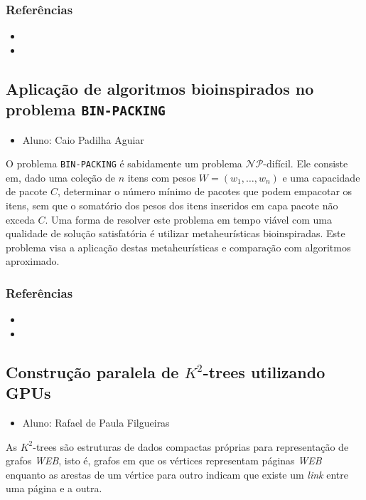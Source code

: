 \documentclass{article}
\newcommand*{\nsubsection}[1]{
    \subsection{#1}
}
\begin{document}
\subsubsection*{Referências}

\begin{itemize}
	\item {}
	\item {}
\end{itemize}

\nsubsection{Aplicação de algoritmos bioinspirados no problema {\tt BIN-PACKING}}

\begin{itemize}
	\item Aluno: Caio Padilha Aguiar
\end{itemize}


O problema {\tt BIN-PACKING} é sabidamente um problema $\mathcal{N\!P}$-difícil. Ele consiste em, dado uma coleção de $n$ itens com pesos $W=(w_1,\ldots,w_n)$ e uma capacidade de pacote $C$, determinar o número mínimo de pacotes que podem empacotar os itens, sem que o somatório dos pesos dos itens inseridos em capa pacote não exceda $C$. Uma forma de resolver este problema em tempo viável com uma qualidade de solução satisfatória é utilizar metaheurísticas bioinspiradas. Este problema visa a aplicação destas metaheurísticas e comparação com algoritmos aproximado.


\subsubsection*{Referências}

\begin{itemize}
	\item {}
	\item {}
\end{itemize}

\nsubsection{Construção paralela de $K^2$-trees utilizando GPUs}

\begin{itemize}
	\item Aluno: Rafael de Paula Filgueiras
\end{itemize}

As $K^2$-trees são estruturas de dados compactas próprias para representação de grafos \textit{WEB}, isto é, grafos em que os vértices representam páginas \textit{WEB} enquanto as arestas de um vértice para outro indicam que existe um \textit{link} entre uma página e a outra.
\end{document}
